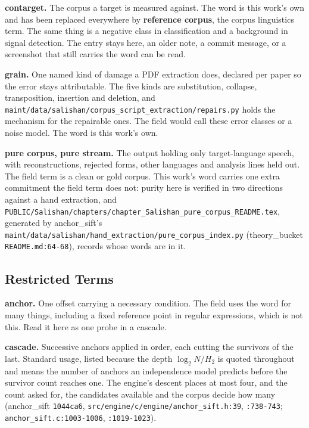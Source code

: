 \noindent\textbf{contarget.} The corpus a target is measured against. The word is this work's own and has been replaced everywhere by \textbf{reference corpus}, the corpus linguistics term. The same thing is a negative class in classification and a background in signal detection. The entry stays here, an older note, a commit message, or a screenshot that still carries the word can be read.

\noindent\textbf{grain.} One named kind of damage a PDF extraction does, declared per paper so the error stays attributable. The five kinds are substitution, collapse, transposition, insertion and deletion, and \texttt{maint/\allowbreak{}data/\allowbreak{}salishan/\allowbreak{}corpus\_\allowbreak{}script\_\allowbreak{}extraction/\allowbreak{}repairs.\allowbreak{}py} holds the mechanism for the repairable ones. The field would call these error classes or a noise model. The word is this work's own.

\noindent\textbf{pure corpus, pure stream.} The output holding only target-language speech, with reconstructions, rejected forms, other languages and analysis lines held out. The field term is a clean or gold corpus. This work's word carries one extra commitment the field term does not: purity here is verified in two directions against a hand extraction, and \texttt{PUBLIC/\allowbreak{}Salishan/\allowbreak{}chapters/\allowbreak{}chapter\_\allowbreak{}Salishan\_\allowbreak{}pure\_\allowbreak{}corpus\_\allowbreak{}README.\allowbreak{}tex}, generated by anchor\_sift's \texttt{maint/\allowbreak{}data/\allowbreak{}salishan/\allowbreak{}hand\_\allowbreak{}extraction/\allowbreak{}pure\_\allowbreak{}corpus\_\allowbreak{}index.\allowbreak{}py} (theory\_bucket \texttt{README.md:64-\allowbreak{}68}), records whose words are in it.

\subsection{Restricted Terms}

\noindent\textbf{anchor.} One offset carrying a necessary condition. The field uses the word for many things, including a fixed reference point in regular expressions, which is not this. Read it here as one probe in a cascade.

\noindent\textbf{cascade.} Successive anchors applied in order, each cutting the survivors of the last. Standard usage, listed because the depth \(\log_2 N / H_2\) is quoted throughout and means the number of anchors an independence model predicts before the survivor count reaches one. The engine's descent places at most four, and the count asked for, the candidates available and the corpus decide how many (anchor\_sift \texttt{1044ca6}, \texttt{src/\allowbreak{}engine/\allowbreak{}c/\allowbreak{}engine/\allowbreak{}anchor\_sift.h:39}, \texttt{:738-743}; \texttt{anchor\_sift.c:1003-1006}, \texttt{:1019-1023}).

